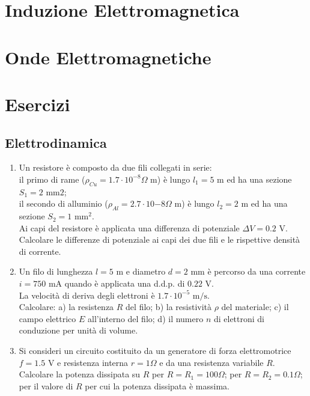 \documentclass{article}
\numberwithin{equation}{subsection}
\begin{document}
	\section{Induzione Elettromagnetica}
	
	
	\section{Onde Elettromagnetiche}
	
	
	\section{Esercizi}
	\subsection{Elettrodinamica}
	\begin{enumerate}
		\item Un resistore è composto da due fili collegati in serie: \\
		il primo di rame ($\rho_{Cu} = 1.7 \cdot 10^{-8} \Omega \text{ m}$) è lungo $l_1 = 5 \text{ m}$ ed ha una sezione $S_1 = 2 \text{ mm}2$; \\
		il secondo di alluminio ($\rho_{Al} = 2.7 \cdot 10{-8} \Omega \text{ m}$) è lungo $l_2 = 2 \text{ m}$ ed ha una sezione $S_2 = 1 \text{ mm}^2$. \\
		Ai capi del resistore è applicata una differenza di potenziale $\Delta V = 0.2 \text{ V}$. \\
		Calcolare le differenze di potenziale ai capi dei due fili e le rispettive densità di corrente.
		\item Un filo di lunghezza $l = 5 \text{ m}$ e diametro $d = 2 \text{ mm}$ è percorso da una corrente $i = 750 \text{ mA}$ quando è applicata una d.d.p. di $0.22 \text{ V}$. \\
		La velocità di deriva degli elettroni è $1.7 \cdot 10^{-5} \text{ m/s}$. \\
		Calcolare: a) la resistenza $R$ del filo; b) la resistività $\rho$ del materiale; c) il campo elettrico $E$ all’interno del filo; d) il numero $n$ di elettroni di conduzione per unità di volume.
		\item Si consideri un circuito costituito da un generatore di forza elettromotrice $f = 1.5 \text{ V}$ e resistenza interna $r = 1 \Omega$ e da una resistenza variabile $R$. \\
		Calcolare la potenza dissipata su $R$ per $R=R_1=100 \Omega$; per $R=R_2=0.1 \Omega$; per il valore di $R$ per cui la potenza dissipata è massima.
	\end{enumerate}
\end{document}
